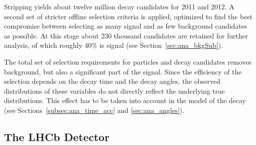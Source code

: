 Stripping yields about twelve million \BstoJpsiKK{} decay candidates for 2011 and 2012. A second set of stricter offline selection criteria
is applied, optimized to find the best compromise between selecting as many signal and as few background candidates as possible. At this
stage about 230 thousand candidates are retained for further analysis, of which roughly 40\% is signal (see Section~\ref{sec:ana_bkgSub}).

The total set of selection requirements for particles and decay candidates removes background, but also a significant part of the signal.
Since the efficiency of the selection depends on the decay time and the decay angles, the observed distributions of these variables do not
directly reflect the underlying true distributions. This effect has to be taken into account in the model of the decay (see
Sections~\ref{subsec:ana_time_acc} and \ref{sec:ana_angles}).


\subsection{The LHCb Detector}
\label{subsec:intro_LHCb_detector}

